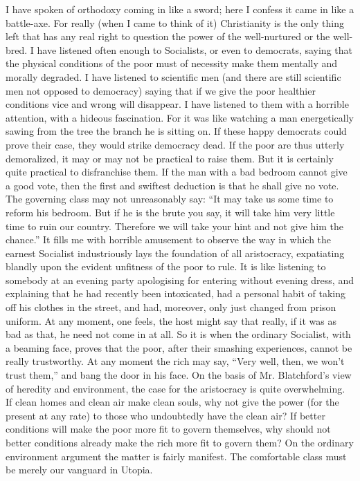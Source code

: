 I have spoken of orthodoxy coming in like a sword; here I confess it came in like a battle-axe. For really (when I came to think of it) Christianity is the only thing left that has any real right to question the power of the well-nurtured or the well-bred. I have listened often enough to Socialists, or even to democrats, saying that the physical conditions of the poor must of necessity make them mentally and morally degraded. I have listened to scientific men (and there are still scientific men not opposed to democracy) saying that if we give the poor healthier conditions vice and wrong will disappear. I have listened to them with a horrible attention, with a hideous fascination. For it was like watching a man energetically sawing from the tree the branch he is sitting on. If these happy democrats could prove their case, they would strike democracy dead. If the poor are thus utterly demoralized, it may or may not be practical to raise them. But it is certainly quite practical to disfranchise them. If the man with a bad bedroom cannot give a good vote, then the first and swiftest deduction is that he shall give no vote. The governing class may not unreasonably say: “It may take us some time to reform his bedroom. But if he is the brute you say, it will take him very little time to ruin our country. Therefore we will take your hint and not give him the chance.” It fills me with horrible amusement to observe the way in which the earnest Socialist industriously lays the foundation of all aristocracy, expatiating blandly upon the evident unfitness of the poor to rule. It is like listening to somebody at an evening party apologising for entering without evening dress, and explaining that he had recently been intoxicated, had a personal habit of taking off his clothes in the street, and had, moreover, only just changed from prison uniform. At any moment, one feels, the host might say that really, if it was as bad as that, he need not come in at all. So it is when the ordinary Socialist, with a beaming face, proves that the poor, after their smashing experiences, cannot be really trustworthy. At any moment the rich may say, “Very well, then, we won’t trust them,” and bang the door in his face. On the basis of Mr. Blatchford’s view of heredity and environment, the case for the aristocracy is quite overwhelming. If clean homes and clean air make clean souls, why not give the power (for the present at any rate) to those who undoubtedly have the clean air? If better conditions will make the poor more fit to govern themselves, why should not better conditions already make the rich more fit to govern them? On the ordinary environment argument the matter is fairly manifest. The comfortable class must be merely our vanguard in Utopia.

